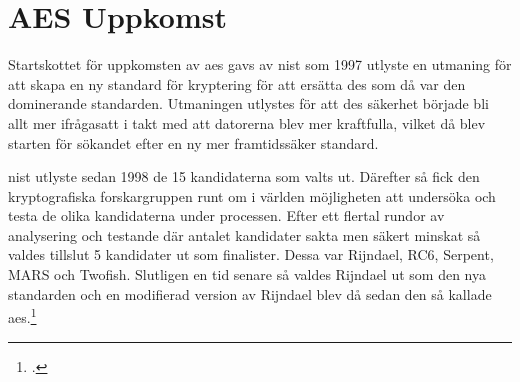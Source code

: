 \section{AES Uppkomst} %
\label{sec:aes-uppkomst}
Startskottet för uppkomsten av \acrshort{aes} gavs av \acrfull{nist} som 1997
utlyste en utmaning för att skapa en ny standard för kryptering för att ersätta
\acrshort{des} som då var den dominerande standarden. Utmaningen utlystes för att
\acrshort{des} säkerhet började bli allt mer ifrågasatt i takt med att datorerna blev mer kraftfulla, vilket då blev starten för sökandet efter
en ny mer framtidssäker standard.

\acrshort{nist} utlyste sedan 1998 de 15 kandidaterna som valts ut. Därefter så fick
den kryptografiska forskargruppen runt om i världen möjligheten att undersöka och testa
de olika kandidaterna under processen. Efter ett flertal rundor av analysering och testande
där antalet kandidater sakta men säkert minskat så valdes tillslut 5 kandidater ut som
finalister. Dessa var Rijndael, RC6, Serpent, MARS och Twofish. Slutligen en tid senare så
valdes Rijndael ut som den nya standarden och en modifierad version av Rijndael
blev då sedan den så kallade \acrfull{aes}.\footcite{nechvatal2001report}
